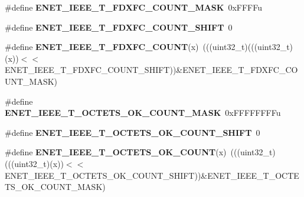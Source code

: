 \begin{DoxyCompactItemize}
\item 
\#define {\bfseries E\+N\+E\+T\+\_\+\+I\+E\+E\+E\+\_\+\+T\+\_\+\+F\+D\+X\+F\+C\+\_\+\+C\+O\+U\+N\+T\+\_\+\+M\+A\+SK}~0x\+F\+F\+F\+Fu\hypertarget{group__ENET__Register__Masks_gab017cc2737c10a8709398a3a47dc3ade}{}\label{group__ENET__Register__Masks_gab017cc2737c10a8709398a3a47dc3ade}

\item 
\#define {\bfseries E\+N\+E\+T\+\_\+\+I\+E\+E\+E\+\_\+\+T\+\_\+\+F\+D\+X\+F\+C\+\_\+\+C\+O\+U\+N\+T\+\_\+\+S\+H\+I\+FT}~0\hypertarget{group__ENET__Register__Masks_ga122b6e4e5176d31a1f66b7f04c18826f}{}\label{group__ENET__Register__Masks_ga122b6e4e5176d31a1f66b7f04c18826f}

\item 
\#define {\bfseries E\+N\+E\+T\+\_\+\+I\+E\+E\+E\+\_\+\+T\+\_\+\+F\+D\+X\+F\+C\+\_\+\+C\+O\+U\+NT}(x)~(((uint32\+\_\+t)(((uint32\+\_\+t)(x))$<$$<$E\+N\+E\+T\+\_\+\+I\+E\+E\+E\+\_\+\+T\+\_\+\+F\+D\+X\+F\+C\+\_\+\+C\+O\+U\+N\+T\+\_\+\+S\+H\+I\+FT))\&E\+N\+E\+T\+\_\+\+I\+E\+E\+E\+\_\+\+T\+\_\+\+F\+D\+X\+F\+C\+\_\+\+C\+O\+U\+N\+T\+\_\+\+M\+A\+SK)\hypertarget{group__ENET__Register__Masks_ga8c8fc6886dc17857025cdbc8da521a39}{}\label{group__ENET__Register__Masks_ga8c8fc6886dc17857025cdbc8da521a39}

\item 
\#define {\bfseries E\+N\+E\+T\+\_\+\+I\+E\+E\+E\+\_\+\+T\+\_\+\+O\+C\+T\+E\+T\+S\+\_\+\+O\+K\+\_\+\+C\+O\+U\+N\+T\+\_\+\+M\+A\+SK}~0x\+F\+F\+F\+F\+F\+F\+F\+Fu\hypertarget{group__ENET__Register__Masks_ga6f934fd96f95ccb0d4faa6c215f86cf7}{}\label{group__ENET__Register__Masks_ga6f934fd96f95ccb0d4faa6c215f86cf7}

\item 
\#define {\bfseries E\+N\+E\+T\+\_\+\+I\+E\+E\+E\+\_\+\+T\+\_\+\+O\+C\+T\+E\+T\+S\+\_\+\+O\+K\+\_\+\+C\+O\+U\+N\+T\+\_\+\+S\+H\+I\+FT}~0\hypertarget{group__ENET__Register__Masks_ga56ee9e359f04a1e6250f1fb5bf0ce288}{}\label{group__ENET__Register__Masks_ga56ee9e359f04a1e6250f1fb5bf0ce288}

\item 
\#define {\bfseries E\+N\+E\+T\+\_\+\+I\+E\+E\+E\+\_\+\+T\+\_\+\+O\+C\+T\+E\+T\+S\+\_\+\+O\+K\+\_\+\+C\+O\+U\+NT}(x)~(((uint32\+\_\+t)(((uint32\+\_\+t)(x))$<$$<$E\+N\+E\+T\+\_\+\+I\+E\+E\+E\+\_\+\+T\+\_\+\+O\+C\+T\+E\+T\+S\+\_\+\+O\+K\+\_\+\+C\+O\+U\+N\+T\+\_\+\+S\+H\+I\+FT))\&E\+N\+E\+T\+\_\+\+I\+E\+E\+E\+\_\+\+T\+\_\+\+O\+C\+T\+E\+T\+S\+\_\+\+O\+K\+\_\+\+C\+O\+U\+N\+T\+\_\+\+M\+A\+SK)\hypertarget{group__ENET__Register__Masks_ga69bb269ecd63f2cf3d274f4e3bcccb9f}{}\label{group__ENET__Register__Masks_ga69bb269ecd63f2cf3d274f4e3bcccb9f}


\end{DoxyCompactItemize}
